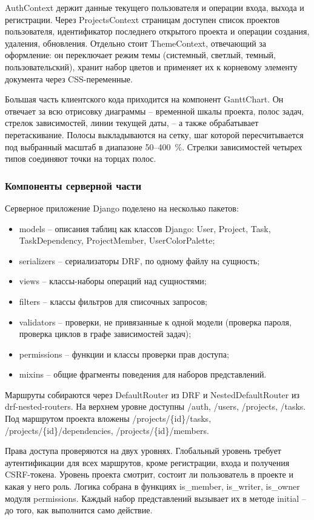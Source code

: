 AuthContext держит данные текущего пользователя и операции входа, выхода и регистрации. Через ProjectsContext страницам доступен список проектов пользователя, идентификатор последнего открытого проекта и операции создания, удаления, обновления. Отдельно стоит ThemeContext, отвечающий за оформление: он переключает режим темы (системный, светлый, темный, пользовательский), хранит набор цветов и применяет их к корневому элементу документа через CSS-переменные.

Большая часть клиентского кода приходится на компонент GanttChart. Он отвечает за всю отрисовку диаграммы -- временной шкалы проекта, полос задач, стрелок зависимостей, линии текущей даты, -- а также обрабатывает перетаскивание. Полосы выкладываются на сетку, шаг которой пересчитывается под выбранный масштаб в диапазоне 50--400~\%. Стрелки зависимостей четырех типов соединяют точки на торцах полос.

\subsubsection{Компоненты серверной части}

Серверное приложение Django поделено на несколько пакетов:
\begin{itemize}
    \item models -- описания таблиц как классов Django: User, Project, Task, TaskDependency, ProjectMember, UserColorPalette;
    \item serializers -- сериализаторы DRF, по одному файлу на сущность;
    \item views -- классы-наборы операций над сущностями;
    \item filters -- классы фильтров для списочных запросов;
    \item validators -- проверки, не привязанные к одной модели (проверка пароля, проверка циклов в графе зависимостей задач);
    \item permissions -- функции и классы проверки прав доступа;
    \item mixins -- общие фрагменты поведения для наборов представлений.
\end{itemize}

Маршруты собираются через DefaultRouter из DRF и NestedDefaultRouter из drf-nested-routers. На верхнем уровне доступны /auth, /users, /projects, /tasks. Под маршрутом проекта вложены /projects/\{id\}/tasks, /projects/\{id\}/dependencies, /projects/\{id\}/members.

Права доступа проверяются на двух уровнях. Глобальный уровень требует аутентификации для всех маршрутов, кроме регистрации, входа и получения CSRF-токена. Уровень проекта смотрит, состоит ли пользователь в проекте и какая у него роль. Логика собрана в функциях is\_member, is\_writer, is\_owner модуля permissions. Каждый набор представлений вызывает их в методе initial -- до того, как выполнится само действие.


